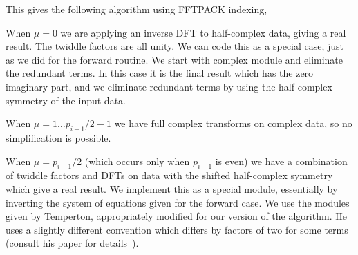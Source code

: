 \documentclass[fleqn,12pt]{article}
\newenvironment{algorithm}{\begin{quote} %
\begin{algorithmic}\samepage}{\end{algorithmic} %
\end{quote}}
\begin{document}
This gives the following algorithm using FFTPACK indexing,
%
\begin{algorithm}
\ENDFOR
{}
\ENDFOR

\ENDFOR
\ENDFOR
{}
\ENDFOR
\end{algorithm}
%
When $\mu=0$ we are applying an inverse DFT to half-complex data,
giving a real result. The twiddle factors are all unity. We can code
this as a special case, just as we did for the forward routine. We
start with complex module and eliminate the redundant terms. In this
case it is the final result which has the zero imaginary part, and we
eliminate redundant terms by using the half-complex symmetry of the
input data. 

When $\mu=1 \dots p_{i-1}/2 - 1$ we have full complex transforms on
complex data, so no simplification is possible.

When $\mu = p_{i-1}/2$ (which occurs only when $p_{i-1}$ is even) we
have a combination of twiddle factors and DFTs on data with the
shifted half-complex symmetry which give a real result. We implement
this as a special module, essentially by inverting the system of
equations given for the forward case. We use the modules given by
Temperton, appropriately modified for our version of the algorithm. He
uses a slightly different convention which differs by factors of two
for some terms (consult his paper for details~\cite{temperton83real}).
\end{document}
